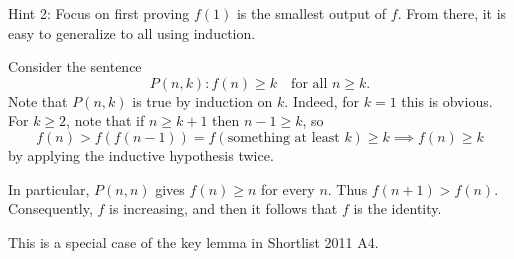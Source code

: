 \documentclass[11pt,twoside]{scrartcl}
\begin{document}
Hint 2: Focus on first proving $f(1)$ is the smallest output of $f$. From there, it is easy to generalize to all  using induction.


Consider the sentence
\[ P(n,k) : f(n) \ge k \quad \text{for all } n \ge k. \]
Note that $P(n,k)$ is true by induction on $k$.
Indeed, for $k = 1$ this is obvious.
For $k \ge 2$, note that if $n \ge k+1$ then $n-1 \ge k$, so
\[ f(n) > f(f(n-1)) = f(\text{something at least $k$}) \ge k
	\implies f(n) \ge k \]
by applying the inductive hypothesis twice.

In particular, $P(n,n)$ gives $f(n) \ge n$ for every $n$.
Thus $f(n+1) > f(n)$.
Consequently, $f$ is increasing,
and then it follows that $f$ is the identity.
\begin{remark*}
This is a special case of the key lemma in Shortlist 2011 A4.
\end{remark*}
\end{document}
